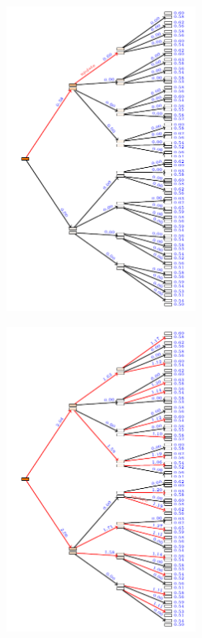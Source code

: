 \documentclass[aspectratio=169]{beamer}
\begin{document}
\begin{landscape}
    \begin{frame}
        \begin{figure}
            \includegraphics[width=0.55\textwidth]{trees/2/tex_tree_2.pdf}
        \end{figure}
    \end{frame}
\end{landscape}

\begin{landscape}
    \begin{frame}
        \begin{figure}
            \includegraphics[width=0.55\textwidth]{trees/2/tex_tree_28.pdf}
        \end{figure}
    \end{frame}
\end{landscape}
\end{document}
